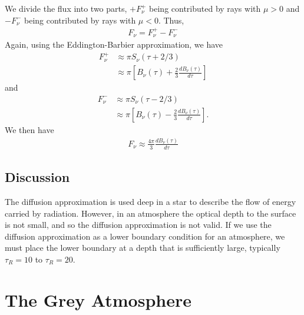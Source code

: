 We divide the flux into two parts, $+F_\nu^+$ being contributed by rays with $\mu > 0$ and $-F_\nu^-$ being contributed by rays with $\mu < 0$. Thus,
\begin{align}
F_\nu = F_\nu^+ - F_\nu^-
\end{align}
Again, using the Eddington-Barbier approximation, we have
\begin{align}
F_\nu^+ &\approx \pi S_\nu(\tau + 2/3)\\
&\approx \pi\left[B_\nu(\tau) + \frac{2}{3} \frac{dB_\nu(\tau)}{d\tau}\right]
\end{align}
and
\begin{align}
F_\nu^- &\approx \pi S_\nu(\tau - 2/3)\\
&\approx \pi\left[B_\nu(\tau) - \frac{2}{3} \frac{dB_\nu(\tau)}{d\tau}\right].
\end{align}
We then have
\begin{align}
F_\nu \approx \frac{4\pi}{3} \frac{dB_\nu(\tau)}{d\tau}
\end{align}

%

\newslide

\subsection{Discussion}

The diffusion approximation is used deep in a star to describe the flow of energy carried by radiation. However, in an atmosphere the optical depth to the surface is not small, and so the diffusion approximation is not valid. If we use the diffusion approximation as a lower boundary condition for an atmosphere, we must place the lower boundary at a depth that is sufficiently large, typically $\tau_R = 10$ to $\tau_R = 20$.

\newslide

\section{The Grey Atmosphere}
\label{section:grey-atmosphere}


